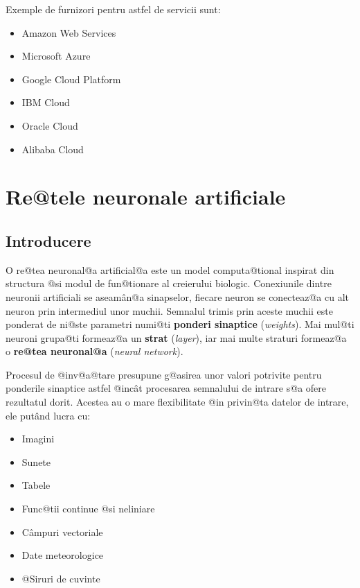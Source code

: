 Exemple de furnizori pentru astfel de servicii sunt:

\begin{itemize}
	\item Amazon Web Services
	\item Microsoft Azure 
	\item Google Cloud Platform
	\item IBM Cloud
	\item Oracle Cloud
	\item Alibaba Cloud
\end{itemize}

	

\chapter{Re@tele neuronale artificiale}



\section{Introducere}



O re@tea neuronal@a artificial@a este un model computa@tional inspirat din structura @si modul de fun@tionare al creierului biologic. Conexiunile dintre neuronii artificiali se aseam\^ an@a sinapselor, fiecare neuron se conecteaz@a cu alt neuron prin intermediul unor muchii. Semnalul trimis prin aceste muchii este ponderat de ni@ste parametri numi@ti \textbf{ponderi sinaptice} (\textsl{weights}). Mai mul@ti neuroni grupa@ti formeaz@a un \textbf{strat} (\textsl{layer}), iar mai multe straturi formeaz@a o \textbf{re@tea neuronal@a} (\textsl{neural network}).

Procesul de @inv@a@tare presupune g@asirea unor valori potrivite pentru ponderile sinaptice astfel @inc\^ at procesarea semnalului de intrare s@a ofere rezultatul dorit. Acestea au o mare flexibilitate @in privin@ta datelor de intrare, ele put\^ and lucra cu:

\begin{itemize}
	\item Imagini
	\item Sunete
	\item Tabele
	\item Func@tii continue @si neliniare
	\item C\^ ampuri vectoriale
	\item Date meteorologice
	\item @Siruri de cuvinte
\end{itemize}

